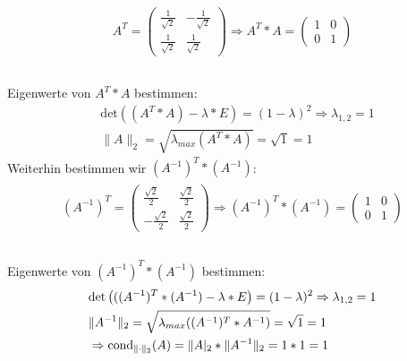 \begin{align*}
\begin{split}
A^T =
\begin{pmatrix}
\frac{1}{\sqrt{2}}&-\frac{1}{\sqrt{2}}\\
\frac{1}{\sqrt{2}}&\frac{1}{\sqrt{2}}
\end{pmatrix}
\Rightarrow A^T*A=
\begin{pmatrix}
1&0\\
0&1
\end{pmatrix}\\
\end{split}
\end{align*}\\
Eigenwerte von $A^T*A$ bestimmen:\\
\begin{align*}
&\mathrm{det}\left((A^T*A)-\lambda*E\right)=(1-\lambda)^2
\Rightarrow \lambda_{1,2}=1\\
&\|A\|_2=\sqrt{\lambda_{max}(A^T*A)}=\sqrt{1}=1
\end{align*}
Weiterhin bestimmen wir $(A^{-1})^T*(A^{-1})$:\\
\begin{align*}
\begin{split}
(A^{-1})^T =
\begin{pmatrix}
\frac{\sqrt{2}}{2}&\frac{\sqrt{2}}{2}\\
-\frac{\sqrt{2}}{2}&\frac{\sqrt{2}}{2}
\end{pmatrix}
\Rightarrow (A^{-1})^T*(A^{-1})=
\begin{pmatrix}
1&0\\
0&1
\end{pmatrix}\\
\end{split}
\end{align*}\\
Eigenwerte von $(A^{-1})^T*(A^{-1})$ bestimmen:\\
\begin{align*}
&\mathrm{det}\left(((A^{-1})^T*(A^{-1})-\lambda*E\right)=(1-\lambda)^2
\Rightarrow \lambda_{1,2}=1\\
&\|A^{-1}\|_2=\sqrt{\lambda_{max}((A^{-1})^T*A^{-1})}=\sqrt{1}=1\\
&\Rightarrow\mathrm{cond}_{\| \cdot \|_2}(A)=\|A|_2*\|A^{-1}\|_2=1*1=1\\
\end{align*}

